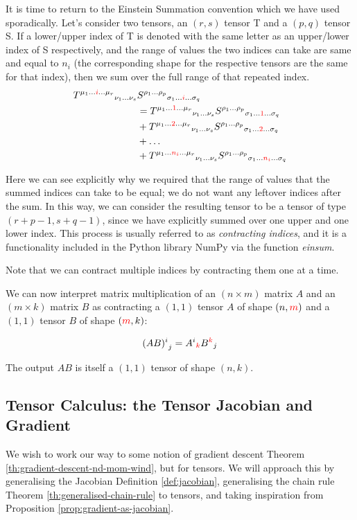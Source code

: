 \documentclass[a4paper]{article}
\theoremstyle{plain} %
\theoremstyle{definition} %
\numberwithin{equation}{subsection}
\begin{document}
It is time to return to the Einstein Summation convention which we have used sporadically. 
Let's consider two tensors, an $(r,s)$ tensor T and a $(p,q)$ tensor S. 
If a lower/upper index of T is denoted with the same letter as an upper/lower index of S respectively, 
and the range of values the two indices can take are same and equal to $n_i$ (the corresponding shape for the respective tensors are the same for that index), 
then we sum over the full range of that repeated index.
\begin{align*}
{T^{\mu_1 \dots \textcolor{red}{i} \dots \mu_r}}_{\nu_1 \dots \nu_s} &{S^{\rho_1 \dots \rho_p}}_{\sigma_1 \dots \textcolor{red}{i} \dots \sigma_q} \\
 &= {T^{\mu_1 \dots \textcolor{red}{1} \dots \mu_r}}_{\nu_1 \dots \nu_s} {S^{\rho_1 \dots \rho_p}}_{\sigma_1 \dots \textcolor{red}{1} \dots \sigma_q} \\
 &+ {T^{\mu_1 \dots \textcolor{red}{2} \dots \mu_r}}_{\nu_1 \dots \nu_s} {S^{\rho_1 \dots \rho_p}}_{\sigma_1 \dots \textcolor{red}{2} \dots \sigma_q} \\
 &+ \dots \\
 &+ {T^{\mu_1 \dots \textcolor{red}{n_i} \dots \mu_r}}_{\nu_1 \dots \nu_s} {S^{\rho_1 \dots \rho_p}}_{\sigma_1 \dots \textcolor{red}{n_i} \dots \sigma_q}
\end{align*}

Here we can see explicitly why we required that the range of values that the summed indices can take to be equal; we do not want any leftover indices after the sum.
In this way, we can consider the resulting tensor to be a tensor of type $(r+p-1,s+q-1)$, since we have explicitly summed over one upper and one lower index.
This process is usually referred to as \emph{contracting indices}, and it is a functionality included in the Python library NumPy via the function \emph{einsum}.

Note that we can contract multiple indices by contracting them one at a time.

We can now interpret matrix multiplication of an $(n \times m)$ matrix $A$ and an $(m \times k)$ matrix $B$ as contracting a
$(1,1)$ tensor $A$ of shape $(n,\textcolor{red}{m})$ and a $(1,1)$ tensor $B$ of shape $(\textcolor{red}{m},k)$:

\[ {(AB)^i}_j = {A^i}_{\textcolor{red}{k}} {B^{\textcolor{red}{k}}}_j\]

The output $AB$ is itself a $(1,1)$ tensor of shape $(n,k)$.

\subsection{Tensor Calculus: the Tensor Jacobian and Gradient}
We wish to work our way to some notion of gradient descent Theorem \ref{th:gradient-descent-nd-mom-wind}, but for tensors. 
We will approach this by generalising the Jacobian Definition \ref{def:jacobian}, generalising the chain rule Theorem \ref{th:generalised-chain-rule} to tensors, 
and taking inspiration from Proposition \ref{prop:gradient-as-jacobian}.
\end{document}
